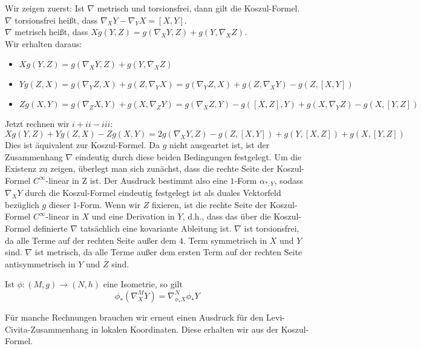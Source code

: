 \begin{beweis}
Wir zeigen zuerst: Ist $\nabla$ metrisch und torsionsfrei, dann gilt die Koszul-Formel.\\
$\nabla$ torsionsfrei heißt, dass $\nabla_X Y - \nabla_Y X = [X,Y]$.\\
$\nabla$ metrisch heißt, dass $X g(Y,Z) = g(\nabla_X Y, Z) + g(Y, \nabla_X Z)$.\\
Wir erhalten daraus:
\begin{itemize}
\item $Xg(Y,Z) = g(\nabla_X Y,Z) + g(Y, \nabla_X Z)$
\item $Yg(Z,X) = g(\nabla_Y Z, X) + g(Z, \nabla_Y X) = g(\nabla_Y Z, X) + g(Z, \nabla_X Y) - g(Z, [X,Y])$
\item $Zg(X,Y) = g(\nabla_Z X, Y) + g(X, \nabla_Z Y)=g(\nabla_X Z,Y) - g([X,Z], Y) + g(X, \nabla_Y Z) - g(X, [Y,Z])$
\end{itemize}
Jetzt rechnen wir $i+ii-iii$:
\begin{equation}
Xg(Y,Z) + Yg(Z,X)-Zg(X,Y) = 2 g(\nabla_X Y, Z) - g(Z, [X,Y]) + g(Y, [X,Z])+g(X, [Y,Z])
\end{equation}
Dies ist äquivalent zur Koszul-Formel. Da $g$ nicht ausgeartet ist, ist der Zusammenhang $\nabla$ eindeutig durch diese beiden Bedingungen festgelegt. Um die Existenz zu zeigen, überlegt man sich zunächst, dass die rechte Seite der Koszul-Formel $C^\infty$-linear in Z ist. Der Ausdruck bestimmt also eine $1$-Form $\alpha_{\ast, Y}$, sodass $\nabla_X Y$ durch die Koszul-Formel eindeutig festgelegt ist als duales Vektorfeld bezüglich $g$ dieser $1$-Form. Wenn wir $Z$ fixieren, ist die rechte Seite der Koszul-Formel $C^\infty$-linear in $X$ und eine Derivation in $Y$, d.h., dass das über die Koszul-Formel definierte $\nabla$ tatsächlich eine kovariante Ableitung ist. $\nabla$ ist torsionsfrei, da alle Terme auf der rechten Seite außer dem $4.$ Term symmetrisch in $X$ und $Y$ sind. $\nabla$ ist metrisch, da alle Terme außer dem ersten Term auf der rechten Seite antisymmetrisch in $Y$ und $Z$ sind.
\end{beweis}
\begin{bemerkung}
Ist $\phi: (M, g) \to (N, h)$ eine Isometrie, so gilt
\begin{equation}
\phi_\ast (\nabla_X^M Y) = \nabla_{\phi_\ast X}^N \phi_\ast Y
\end{equation}
\end{bemerkung}
Für manche Rechnungen brauchen wir erneut einen Ausdruck für den Levi-Civita-Zusammenhang in lokalen Koordinaten. Diese erhalten wir aus der Koszul-Formel.
